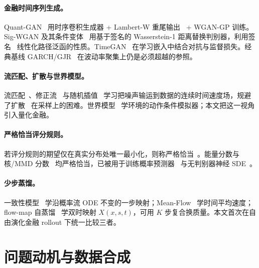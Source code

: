 \documentclass[11pt]{ctexart}
\begin{document}
\paragraph{金融时间序列生成。}
Quant-GAN~\citep{wiese2020quant} 用时序卷积生成器 + Lambert-W 重尾输出~\citep{goerg2015lambert} + WGAN-GP 训练。Sig-WGAN 及其条件变体~\citep{ni2021sigwgan,ni2020conditional} 用基于签名的 Wasserstein-1 距离替换判别器，利用签名~\citep{lyons2007differential} 线性化路径泛函的性质。TimeGAN~\citep{yoon2019timegan} 在学习嵌入中结合对抗与监督损失。经典基线 GARCH/GJR~\citep{bollerslev1986garch,glosten1993relation,bollerslev1987conditionally} 在波动率聚集上仍是必须超越的参照。

\paragraph{流匹配、扩散与世界模型。}
流匹配~\citep{lipman2023flow}、修正流~\citep{liu2023rectified} 与随机插值~\citep{albergo2023stochastic} 学习把噪声输运到数据的连续时间速度场，规避了扩散~\citep{ho2020denoising,karras2022elucidating} 在采样上的困难。世界模型~\citep{ha2018world,alonso2024diamond} 学环境的动作条件模拟器；本文把这一视角引入量化金融。

\paragraph{严格恰当评分规则。}
若评分规则的期望仅在真实分布处唯一最小化，则称严格恰当~\citep{gneiting2007strictly}。能量分数与核/MMD 分数~\citep{gretton2012kernel} 均严格恰当，已被用于训练概率预测器~\citep{pacchiardi2024probabilistic} 与无判别器神经 SDE~\citep{issa2023nonadversarial}。

\paragraph{少步蒸馏。}
一致性模型~\citep{song2023consistency,song2024improved} 学沿概率流 ODE 不变的一步映射；Mean-Flow~\citep{geng2025meanflow} 学时间平均速度；flow-map 自蒸馏~\citep{boffi2025flowmaps} 学双时映射 $X(x,s,t)$，可用 $K$ 步复合换质量。本文首次在自由演化金融 rollout 下统一比较三者。

\section{问题动机与数据合成}
\label{sec:setup}
\end{document}

